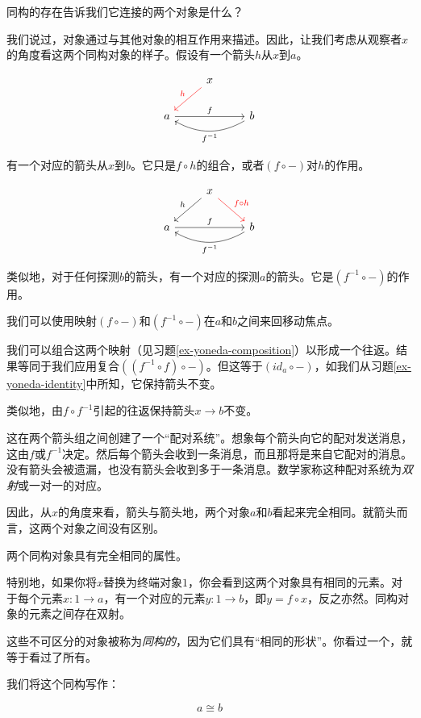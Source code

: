 \documentclass[DaoFP]{subfiles}
\begin{document}
 同构的存在告诉我们它连接的两个对象是什么？

 我们说过，对象通过与其他对象的相互作用来描述。因此，让我们考虑从观察者$x$的角度看这两个同构对象的样子。假设有一个箭头$h$从$x$到$a$。

 \[
  \begin{tikzcd}
   & x
   \arrow[ld, red, "h"']
   \\
   a
   \arrow[rr, "f"]
   && b
   \arrow[ll, bend left,  "f^{-1}"]
  \end{tikzcd}
 \]

 有一个对应的箭头从$x$到$b$。它只是$f \circ h$的组合，或者$(f \circ -)$对$h$的作用。

 \[
  \begin{tikzcd}
   & x
   \arrow[ld, "h"']
   \arrow[rd, red, "f \circ h"]
   \\
   a
   \arrow[rr, "f"]
   && b
   \arrow[ll, bend left,  "f^{-1}"]
  \end{tikzcd}
 \]

 类似地，对于任何探测$b$的箭头，有一个对应的探测$a$的箭头。它是$(f^{-1} \circ -)$的作用。

 我们可以使用映射$(f \circ -)$和$(f^{-1} \circ -)$在$a$和$b$之间来回移动焦点。

 我们可以组合这两个映射（见习题\ref{ex-yoneda-composition}）以形成一个往返。结果等同于我们应用复合$((f^{-1} \circ f) \circ -)$。但这等于$(id_a \circ  -)$，如我们从习题\ref{ex-yoneda-identity}中所知，它保持箭头不变。

 类似地，由$f \circ f^{-1}$引起的往返保持箭头$x \to b$不变。

 这在两个箭头组之间创建了一个“配对系统”。想象每个箭头向它的配对发送消息，这由$f$或$f^{-1}$决定。然后每个箭头会收到一条消息，而且那将是来自它配对的消息。没有箭头会被遗漏，也没有箭头会收到多于一条消息。数学家称这种配对系统为\emph{双射}或一对一的对应。

 因此，从$x$的角度来看，箭头与箭头地，两个对象$a$和$b$看起来完全相同。就箭头而言，这两个对象之间没有区别。

 两个同构对象具有完全相同的属性。

 特别地，如果你将$x$替换为终端对象$1$，你会看到这两个对象具有相同的元素。对于每个元素$x \colon 1 \to a$，有一个对应的元素$y \colon 1 \to b$，即$y = f \circ x$，反之亦然。同构对象的元素之间存在双射。

 这些不可区分的对象被称为\emph{同构的}，因为它们具有“相同的形状”。你看过一个，就等于看过了所有。

 我们将这个同构写作：

 \[a \cong b\]
\end{document}
